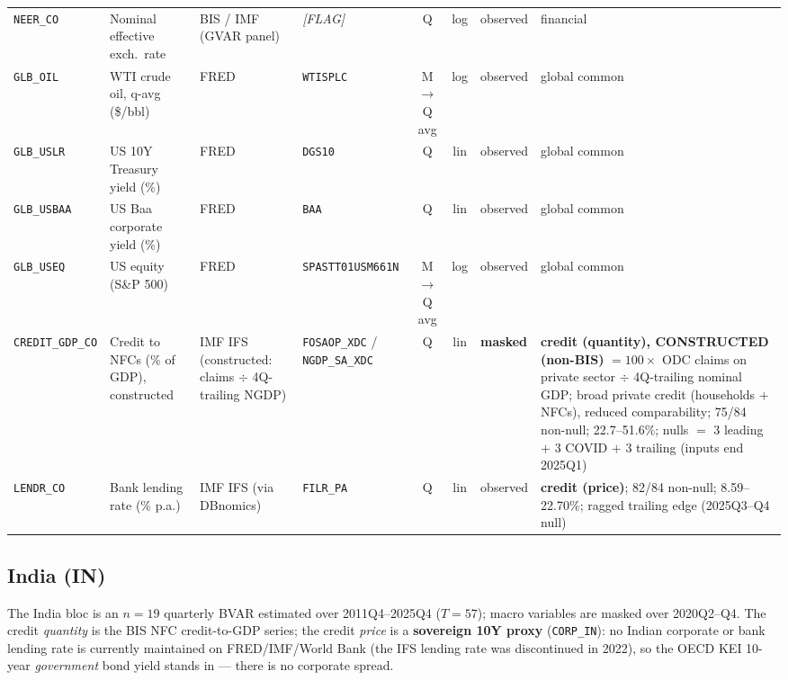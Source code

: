 {\begin{longtable}{@{}llp{2.5cm}p{2.4cm}cclp{2.6cm}@{}}
\texttt{NEER\_CO} & Nominal effective exch.\ rate & BIS / IMF (GVAR panel) & \textit{[FLAG]} & Q & log & observed & financial \\
\texttt{GLB\_OIL} & WTI crude oil, q-avg (\$/bbl) & FRED & \texttt{WTISPLC} & M$\to$Q avg & log & observed & global common \\
\texttt{GLB\_USLR} & US 10Y Treasury yield (\%) & FRED & \texttt{DGS10} & Q & lin & observed & global common \\
\texttt{GLB\_USBAA} & US Baa corporate yield (\%) & FRED & \texttt{BAA} & Q & lin & observed & global common \\
\texttt{GLB\_USEQ} & US equity (S\&P 500) & FRED & \texttt{SPASTT01USM661N} & M$\to$Q avg & log & observed & global common \\
\texttt{CREDIT\_GDP\_CO} & Credit to NFCs (\% of GDP), constructed & IMF IFS (constructed: claims $\div$ 4Q-trailing NGDP) & \texttt{FOSAOP\_XDC} / \texttt{NGDP\_SA\_XDC} & Q & lin & \textbf{masked} & \textbf{credit (quantity), CONSTRUCTED (non-BIS)} $=100\times$ ODC claims on private sector $\div$ 4Q-trailing nominal GDP; broad private credit (households $+$ NFCs), reduced comparability; 75/84 non-null; 22.7--51.6\%; nulls $=$ 3 leading $+$ 3 COVID $+$ 3 trailing (inputs end 2025Q1) \\
\texttt{LENDR\_CO} & Bank lending rate (\% p.a.) & IMF IFS (via DBnomics) & \texttt{FILR\_PA} & Q & lin & observed & \textbf{credit (price)}; 82/84 non-null; 8.59--22.70\%; ragged trailing edge (2025Q3--Q4 null) \\
\end{longtable}}

\subsection{India (IN)}\label{sec:data:IN}

The India bloc is an $n=19$ quarterly BVAR estimated over 2011Q4--2025Q4
($T=57$); macro variables are masked over 2020Q2--Q4. The credit \emph{quantity}
is the BIS NFC credit-to-GDP series; the credit \emph{price} is a
\textbf{sovereign 10Y proxy} (\texttt{CORP\_IN}): no Indian corporate or bank
lending rate is currently maintained on FRED/IMF/World Bank (the IFS lending
rate was discontinued in 2022), so the OECD KEI 10-year \emph{government} bond
yield stands in --- there is no corporate spread.

